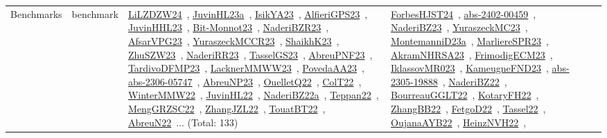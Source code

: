 {\begin{longtable}{lp{3cm}>{\raggedright\arraybackslash}p{6cm}>{\raggedright\arraybackslash}p{6cm}>{\raggedright\arraybackslash}p{8cm}}
\index{benchmark}\index{Benchmarks!benchmark}Benchmarks & benchmark & \href{../works/LiLZDZW24.pdf}{LiLZDZW24}~\cite{LiLZDZW24}, \href{../works/JuvinHL23a.pdf}{JuvinHL23a}~\cite{JuvinHL23a}, \href{../works/IsikYA23.pdf}{IsikYA23}~\cite{IsikYA23}, \href{../works/AlfieriGPS23.pdf}{AlfieriGPS23}~\cite{AlfieriGPS23}, \href{../works/JuvinHHL23.pdf}{JuvinHHL23}~\cite{JuvinHHL23}, \href{../works/Bit-Monnot23.pdf}{Bit-Monnot23}~\cite{Bit-Monnot23}, \href{../works/NaderiBZR23.pdf}{NaderiBZR23}~\cite{NaderiBZR23}, \href{../works/AfsarVPG23.pdf}{AfsarVPG23}~\cite{AfsarVPG23}, \href{../works/YuraszeckMCCR23.pdf}{YuraszeckMCCR23}~\cite{YuraszeckMCCR23}, \href{../works/ShaikhK23.pdf}{ShaikhK23}~\cite{ShaikhK23}, \href{../works/ZhuSZW23.pdf}{ZhuSZW23}~\cite{ZhuSZW23}, \href{../works/NaderiRR23.pdf}{NaderiRR23}~\cite{NaderiRR23}, \href{../works/TasselGS23.pdf}{TasselGS23}~\cite{TasselGS23}, \href{../works/AbreuPNF23.pdf}{AbreuPNF23}~\cite{AbreuPNF23}, \href{../works/TardivoDFMP23.pdf}{TardivoDFMP23}~\cite{TardivoDFMP23}, \href{../works/LacknerMMWW23.pdf}{LacknerMMWW23}~\cite{LacknerMMWW23}, \href{../works/PovedaAA23.pdf}{PovedaAA23}~\cite{PovedaAA23}, \href{../works/abs-2306-05747.pdf}{abs-2306-05747}~\cite{abs-2306-05747}, \href{../works/AbreuNP23.pdf}{AbreuNP23}~\cite{AbreuNP23}, \href{../works/OuelletQ22.pdf}{OuelletQ22}~\cite{OuelletQ22}, \href{../works/ColT22.pdf}{ColT22}~\cite{ColT22}, \href{../works/WinterMMW22.pdf}{WinterMMW22}~\cite{WinterMMW22}, \href{../works/JuvinHL22.pdf}{JuvinHL22}~\cite{JuvinHL22}, \href{../works/NaderiBZ22a.pdf}{NaderiBZ22a}~\cite{NaderiBZ22a}, \href{../works/Teppan22.pdf}{Teppan22}~\cite{Teppan22}, \href{../works/MengGRZSC22.pdf}{MengGRZSC22}~\cite{MengGRZSC22}, \href{../works/ZhangJZL22.pdf}{ZhangJZL22}~\cite{ZhangJZL22}, \href{../works/TouatBT22.pdf}{TouatBT22}~\cite{TouatBT22}, \href{../works/AbreuN22.pdf}{AbreuN22}~\cite{AbreuN22}... (Total: 133) & \href{../works/ForbesHJST24.pdf}{ForbesHJST24}~\cite{ForbesHJST24}, \href{../works/abs-2402-00459.pdf}{abs-2402-00459}~\cite{abs-2402-00459}, \href{../works/NaderiBZ23.pdf}{NaderiBZ23}~\cite{NaderiBZ23}, \href{../works/YuraszeckMC23.pdf}{YuraszeckMC23}~\cite{YuraszeckMC23}, \href{../works/MontemanniD23a.pdf}{MontemanniD23a}~\cite{MontemanniD23a}, \href{../works/MarliereSPR23.pdf}{MarliereSPR23}~\cite{MarliereSPR23}, \href{../works/AkramNHRSA23.pdf}{AkramNHRSA23}~\cite{AkramNHRSA23}, \href{../works/FrimodigECM23.pdf}{FrimodigECM23}~\cite{FrimodigECM23}, \href{../works/IklassovMR023.pdf}{IklassovMR023}~\cite{IklassovMR023}, \href{../works/KameugneFND23.pdf}{KameugneFND23}~\cite{KameugneFND23}, \href{../works/abs-2305-19888.pdf}{abs-2305-19888}~\cite{abs-2305-19888}, \href{../works/NaderiBZ22.pdf}{NaderiBZ22}~\cite{NaderiBZ22}, \href{../works/BourreauGGLT22.pdf}{BourreauGGLT22}~\cite{BourreauGGLT22}, \href{../works/KotaryFH22.pdf}{KotaryFH22}~\cite{KotaryFH22}, \href{../works/ZhangBB22.pdf}{ZhangBB22}~\cite{ZhangBB22}, \href{../works/FetgoD22.pdf}{FetgoD22}~\cite{FetgoD22}, \href{../works/Tassel22.pdf}{Tassel22}~\cite{Tassel22}, \href{../works/OujanaAYB22.pdf}{OujanaAYB22}~\cite{OujanaAYB22}, \href{../works/HeinzNVH22.pdf}{HeinzNVH22}~\cite{HeinzNVH22}, 
\end{longtable}}
